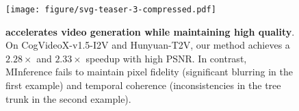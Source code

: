


\begin{figure}[h!]
    \centering
    \texttt{[image: figure/svg-teaser-3-compressed.pdf]}
    \caption{\textbf{\sys{} accelerates video generation while maintaining high quality}. On CogVideoX-v1.5-I2V and Hunyuan-T2V, our method achieves a $2.28\times$ and $2.33\times$ speedup with high PSNR. In contrast, MInference \citep{jiang2024minference} fails to maintain pixel fidelity (significant blurring in the first example) and temporal coherence (inconsistencies in the tree trunk in the second example).}
    \label{fig:teaser}
\end{figure}



